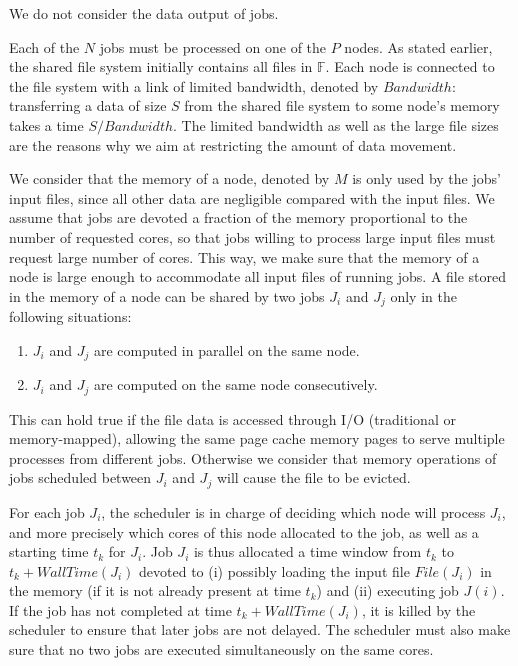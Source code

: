\documentclass[conference,10pt]{IEEEtran}
\newcommand{\Node}[1]{\ensuremath{\mathrm{Node}_{#1}}\xspace}
\newcommand{\file}{\ensuremath{\mathit{File}}\xspace}
\newcommand{\storage}{\ensuremath{\mathit{Storage}}\xspace}
\newcommand{\size}{\ensuremath{\mathit{Size}}\xspace}
\newcommand{\memory}{\ensuremath{\mathit{M}}\xspace}
\newcommand{\bandwidth}{\mathit{Bandwidth}\xspace}
\newcommand{\walltime}{\mathit{WallTime}\xspace}
\newcommand{\fileset}{\ensuremath{\mathbb{F}}\xspace}
\begin{document}
We do not consider the data output of jobs.

Each of the $N$ jobs must be processed on one of the $P$ nodes.  As
stated earlier, the shared file system initially contains all files
in $\fileset$.  Each node is connected to the file system with a link
of limited bandwidth, denoted by $\bandwidth$: transferring a data of
size $S$ from the shared file system to some node's memory takes a
time $S/\bandwidth$.
The limited bandwidth
as well as the large file sizes are the reasons why we aim at
restricting the amount of data movement.

We consider that the memory of a node, denoted by
$\memory$ is only used by the jobs' input files, since all other data are
negligible compared with the input files. We assume that jobs are
devoted a fraction of the memory proportional to the number of
requested cores, so that jobs willing to process large input files
must request large number of cores. This way, we make sure that the
memory of a node is large enough to accommodate all input files of running jobs.
A file stored in the memory of a node can be shared by two jobs $J_i$ and $J_j$ only in the following situations:
\begin{enumerate}
	\item $J_i$ and $J_j$ are computed in parallel on the same node.
	\item $J_i$ and $J_j$ are computed on the same node consecutively.
\end{enumerate}
This can hold true if the file data is accessed through I/O (traditional or memory-mapped),
allowing the same page cache memory pages to serve multiple processes from different jobs.
Otherwise we consider that memory operations of jobs scheduled between
$J_i$ and $J_j$ will cause the file to be evicted.


For each job $J_i$, the scheduler is in charge of deciding which node
will process $J_i$, and more precisely which cores of this node
allocated to the job, as well as a starting time $t_k$ for $J_i$. Job
$J_i$ is thus allocated a time window from $t_k$ to
$t_k+\walltime(J_i)$ devoted to (i) possibly loading the input file
$\file(J_i)$ in the memory (if it is not already present at time
$t_k$) and (ii) executing job $J(i)$. If the job has not completed at
time $t_k+\walltime(J_i)$, it is killed by the scheduler to ensure
that later jobs are not delayed.  The scheduler must also make sure
that no two jobs are executed simultaneously on the same cores.
\end{document}
